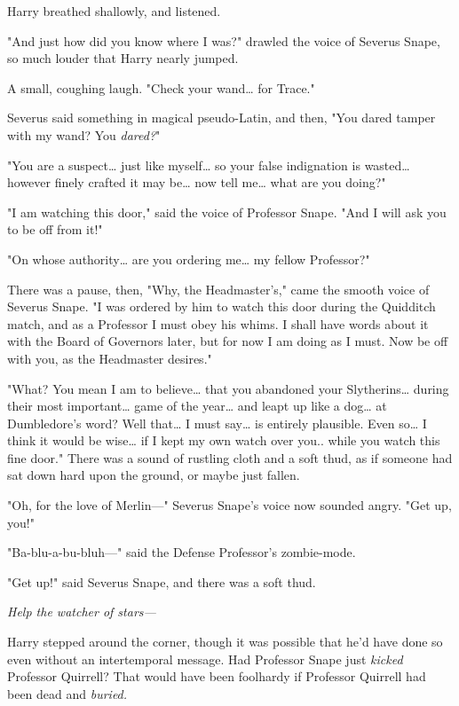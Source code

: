 Harry breathed shallowly, and listened.

"And just how did you know where I was?" drawled the voice of Severus Snape, so 
much louder that Harry nearly jumped.

A small, coughing laugh. "Check your wand{\ldots} for Trace."

Severus said something in magical pseudo-Latin, and then, "You dared tamper 
with my wand? You \emph{dared?}"

"You are a suspect{\ldots} just like myself{\ldots} so your false indignation 
is wasted{\ldots} however finely crafted it may be{\ldots} now tell me{\ldots} 
what are you doing?"

"I am watching this door," said the voice of Professor Snape. "And I will ask 
you to be off from it!"

"On whose authority{\ldots} are you ordering me{\ldots} my fellow Professor?"

There was a pause, then, "Why, the Headmaster's," came the smooth voice of 
Severus Snape. "I was ordered by him to watch this door during the Quidditch 
match, and as a Professor I must obey his whims. I shall have words about it 
with the Board of Governors later, but for now I am doing as I must. Now be off 
with you, as the Headmaster desires."

"What? You mean I am to believe{\ldots} that you abandoned your 
Slytherins{\ldots} during their most important{\ldots} game of the year{\ldots} 
and leapt up like a dog{\ldots} at Dumbledore's word? Well that{\ldots} I must 
say{\ldots} is entirely plausible. Even so{\ldots} I think it would be 
wise{\ldots} if I kept my own watch over you.. while you watch this fine door." 
There was a sound of rustling cloth and a soft thud, as if someone had sat down 
hard upon the ground, or maybe just fallen.

"Oh, for the love of Merlin---" Severus Snape's voice now sounded angry. "Get 
up, you!"

"Ba-blu-a-bu-bluh---" said the Defense Professor's zombie-mode.

"Get up!" said Severus Snape, and there was a soft thud.

\emph{Help the watcher of stars---}

Harry stepped around the corner, though it was possible that he'd have done so 
even without an intertemporal message. Had Professor Snape just \emph{kicked} 
Professor Quirrell? That would have been foolhardy if Professor Quirrell had 
been dead and \emph{buried.}

